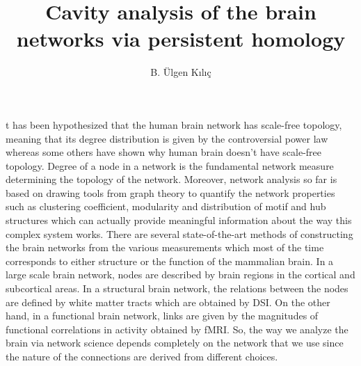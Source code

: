 \documentclass[9pt,twocolumn,twoside,lineno]{pnas-new}
\title{Cavity analysis of the brain networks via persistent homology}
\author[a,1]{B. Ülgen Kılıç}
\affil[a]{State University of New York, University at Buffalo, Department of Mathematics}
\begin{document}
\maketitle
\thispagestyle{firststyle}

t has been hypothesized that the human brain network has scale-free topology, meaning that its degree distribution is given by the controversial power law\cite{smallworld1,smallworld2} whereas some others have shown why human brain doesn't have scale-free topology\cite{smallworld3}. Degree of a node in a network is the fundamental network measure determining the topology of the network. Moreover, network analysis so far is based on drawing tools from graph theory to quantify the network properties such as clustering coefficient, modularity and distribution of motif and hub structures which can actually provide meaningful information about the way this complex system works\cite{graphtheory,netwmeasure}. There are several state-of-the-art methods of constructing the brain networks from the various measurements \cite{stateoftheart} which most of the time corresponds to either structure or the function of the mammalian  brain.  In a large scale brain network, nodes are described by brain regions in the cortical and subcortical areas. In a structural brain network, the relations between the nodes are defined by white matter tracts which are obtained by DSI. On the other hand, in a functional brain network, links are given by the magnitudes of functional correlations in activity obtained by fMRI. So, the way we analyze the brain via network science depends completely on the network that we use since the nature of the connections are derived from different choices.
\end{document}
